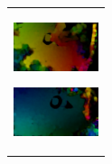 \begin{figure}[htbp]
\begin{tabular}{l}
      \begin{minipage}{0.165\hsize}
        \begin{center}
          \includegraphics[clip, width=2.5cm]{./Figures/optic_commandmatemate4.eps}
          \hspace{0.1cm} { }
        \end{center}
      \end{minipage}
      \begin{minipage}{0.165\hsize}
        \begin{center}
          \includegraphics[clip, width=2.5cm]{./Figures/optic_commandmatemate5.eps}
          \hspace{2.2cm} { }
        \end{center}
      \end{minipage}
\\ %


\end{tabular}
\end{figure}

